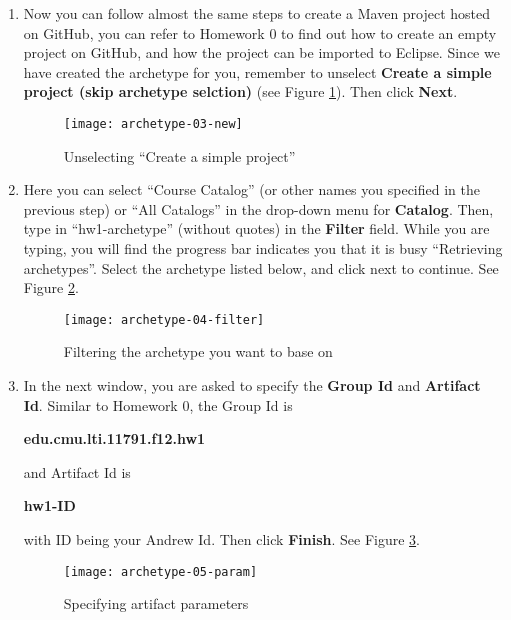 \begin{enumerate}
\item Now you can follow almost the same steps to create a Maven project hosted
on GitHub, you can refer to Homework 0 to find out how to create an empty
project on GitHub, and how the project can be imported to Eclipse. Since we have
created the archetype for you, remember to unselect \textbf{Create a simple
project (skip archetype selction)} (see Figure \ref{fig:archetype-03-new}). Then
click \textbf{Next}.
 
\begin{figure}[t]
\centering
\texttt{[image: archetype-03-new]}
\caption{Unselecting ``Create a simple project''\label{fig:archetype-03-new}}
\end{figure}

\item Here you can select ``Course Catalog'' (or other names you specified in
the previous step) or ``All Catalogs'' in the drop-down menu for
\textbf{Catalog}. Then, type in ``hw1-archetype'' (without quotes) in the \textbf{Filter}
field. While you are typing, you will find the progress bar indicates you that
it is busy ``Retrieving archetypes''. Select the archetype listed below, and
click next to continue. See Figure \ref{fig:archetype-04-filter}.

\begin{figure}[t]
\centering
\texttt{[image: archetype-04-filter]}
\caption{Filtering the archetype you want to base on\label{fig:archetype-04-filter}}
\end{figure}

\item In the next window, you are asked to specify the \textbf{Group Id} and
\textbf{Artifact Id}. Similar to Homework 0, the Group Id is

\begin{center}
\textbf{edu.cmu.lti.11791.f12.hw1}
\end{center}

and Artifact Id is

\begin{center}
\textbf{hw1-ID}
\end{center}

with ID being your Andrew Id. Then click \textbf{Finish}. See Figure
\ref{fig:archetype-05-param}.

\begin{figure}[t]
\centering
\texttt{[image: archetype-05-param]}
\caption{Specifying artifact parameters\label{fig:archetype-05-param}}
\end{figure}


\end{enumerate}
